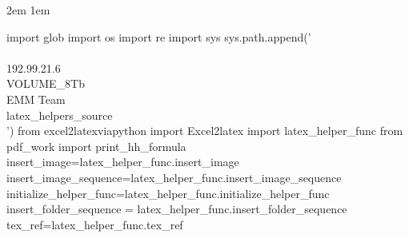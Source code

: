 \usepackage{tocloft}
\advance\cftsecnumwidth 10pt\relax
\advance\cftsubsecindent 2em\relax
\advance\cftsubsecnumwidth 1em\relax

\begin{pycode}
import glob
import os
import re
import sys
sys.path.append('\\\\192.99.21.6\\VOLUME_8Tb\\EMM Team\\latex_helpers_source\\')
from excel2latexviapython import Excel2latex
import latex_helper_func
from pdf_work import print_hh_formula
insert_image=latex_helper_func.insert_image
insert_image_sequence=latex_helper_func.insert_image_sequence
initialize_helper_func=latex_helper_func.initialize_helper_func
insert_folder_sequence = latex_helper_func.insert_folder_sequence
tex_ref=latex_helper_func.tex_ref
\end{pycode}
